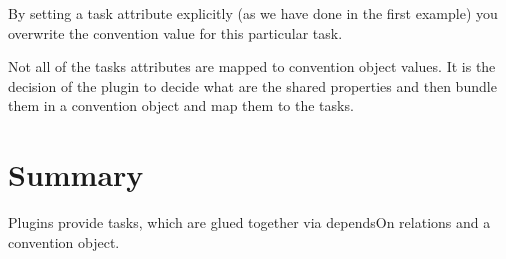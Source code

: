 By setting a task attribute explicitly (as we have done in the first example) you overwrite the convention value for this particular task.

Not all of the tasks attributes are mapped to convention object values. It is the decision of the plugin to decide what are the shared properties and then bundle them in a convention object and map them to the tasks.
\section{Summary} %
\label{sec:summary}
Plugins provide tasks, which are glued together via dependsOn relations and a convention object. 
